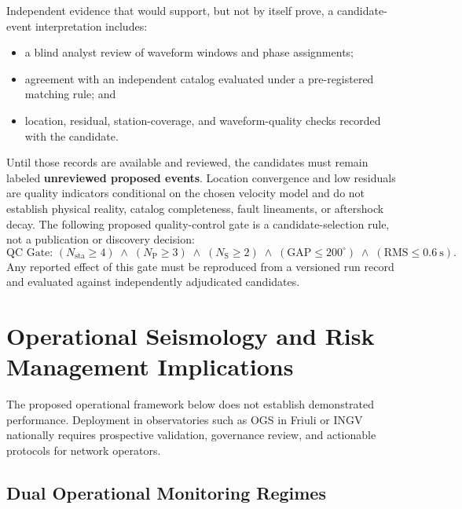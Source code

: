 Independent evidence that would support, but not by itself prove, a
candidate-event interpretation includes:
\begin{itemize}
  \item a blind analyst review of waveform windows and phase assignments;
  \item agreement with an independent catalog evaluated under a
    pre-registered matching rule; and
  \item location, residual, station-coverage, and waveform-quality
    checks recorded with the candidate.
\end{itemize}
Until those records are available and reviewed, the candidates must
remain labeled \textbf{unreviewed proposed events}. Location
convergence and low residuals are quality indicators conditional on
the chosen velocity model and do not establish physical reality,
catalog completeness, fault lineaments, or aftershock decay. The
following proposed quality-control gate is a candidate-selection rule,
not a publication or discovery decision:
\begin{equation}
  \text{QC Gate: } \left( N_{\mathrm{sta}} \ge 4 \right) \;\land\;
  \left( N_{\mathrm{P}} \ge 3 \right) \;\land\; \left(
  N_{\mathrm{S}} \ge 2 \right) \;\land\; \left( \mathrm{GAP} \le
  200^\circ \right) \;\land\; \left( \mathrm{RMS} \le
  \qty{0.6}{\second} \right).
\end{equation}
Any reported effect of this gate must be reproduced from a versioned
run record and evaluated against independently adjudicated candidates.

\section{Operational Seismology and Risk Management Implications}
\label{sec:operational_implications}

The proposed operational framework below does not establish demonstrated
performance. Deployment in observatories such as \ac{OGS} in Friuli
or \ac{INGV}
nationally requires prospective validation, governance review, and actionable
protocols for network operators.

\subsection{Dual Operational Monitoring Regimes}
\label{subsec:monitoring_regimes}

